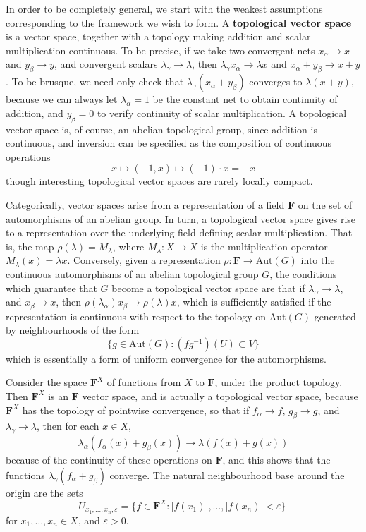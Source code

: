 In order to be completely general, we start with the weakest assumptions corresponding to the framework we wish to form. A {\bf topological vector space} is a vector space, together with a topology making addition and scalar multiplication continuous. To be precise, if we take two convergent nets $x_\alpha \to x$ and $y_\beta \to y$, and convergent scalars $\lambda_\gamma \to \lambda$, then $\lambda_\gamma x_\alpha \to \lambda x$ and $x_\alpha + y_\beta \to x + y$. To be brusque, we need only check that $\lambda_\gamma (x_\alpha + y_\beta)$ converges to $\lambda (x + y)$, because we can always let $\lambda_\alpha = 1$ be the constant net to obtain continuity of addition, and $y_\beta = 0$ to verify continuity of scalar multiplication. A topological vector space is, of course, an abelian topological group, since addition is continuous, and inversion can be specified as the composition of continuous operations
%
\[ x \mapsto (-1,x) \mapsto (-1) \cdot x = -x \]
%
though interesting topological vector spaces are rarely locally compact.

Categorically, vector spaces arise from a representation of a field $\mathbf{F}$ on the set of automorphisms of an abelian group. In turn, a topological vector space gives rise to a representation over the underlying field defining scalar multiplication. That is, the map $\rho(\lambda) = M_\lambda$, where $M_\lambda: X \to X$ is the multiplication operator $M_\lambda(x) = \lambda x$. Conversely, given a representation $\rho: \mathbf{F} \to \text{Aut}(G)$ into the continuous automorphisms of an abelian topological group $G$, the conditions which guarantee that $G$ become a topological vector space are that if $\lambda_\alpha \to \lambda$, and $x_\beta \to x$, then $\rho(\lambda_\alpha) x_\beta \to \rho(\lambda) x$, which is sufficiently satisfied if the representation is continuous with respect to the topology on $\text{Aut}(G)$ generated by neighbourhoods of the form
%
\[ \{ g \in \text{Aut}(G) : (fg^{-1})(U) \subset V \} \]
%
which is essentially a form of uniform convergence for the automorphisms.

\begin{example}
    Consider the space $\mathbf{F}^X$ of functions from $X$ to $\mathbf{F}$, under the product topology. Then $\mathbf{F}^X$ is an $\mathbf{F}$ vector space, and is actually a topological vector space, because $\mathbf{F}^X$ has the topology of pointwise convergence, so that if $f_\alpha \to f$, $g_\beta \to g$, and $\lambda_\gamma \to \lambda$, then for each $x \in X$,
    \[ \lambda_\alpha (f_\alpha(x) + g_\beta(x)) \to \lambda( f(x) + g(x)) \]
    because of the continuity of these operations on $\mathbf{F}$, and this shows that the functions $\lambda_\gamma (f_\alpha + g_\beta)$ converge. The natural neighbourhood base around the origin are the sets
    \[ U_{x_1, \dots, x_n, \varepsilon} = \{ f \in \mathbf{F}^X : |f(x_1)|, \dots, |f(x_n)| < \varepsilon \}\ \]
    for $x_1, \dots, x_n \in X$, and $\varepsilon > 0$.
\end{example}

